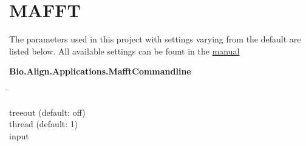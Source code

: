 \section{MAFFT} \label{sec:Clustering_Pipeline}

\blindtext
\autocite{katoh_mafft_2013}
\autocite{cock_biopython_2009}

The parameters used in this project with settings varying from the default are listed below. All available settings can be fount in the \href{https://mafft.cbrc.jp/alignment/software/}{manual}

\begin{leftbar}
    \textbf{Bio.Align.Applications.MafftCommandline}
    \begin{nstabbing}
        \qquad\qquad\qquad\qquad\qquad\quad\=\kill
    
        treeout \> (default: off)\\
        
        thread \> (default: 1)\\
        
        input \>
        
    \end{nstabbing}
\end{leftbar}


